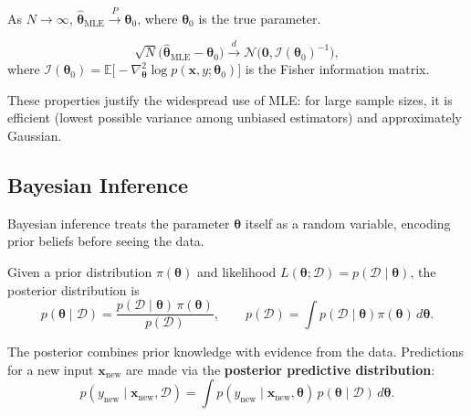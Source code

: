 \documentclass{tufte-handout}
\begin{document}
\begin{thm}[Consistency]
    As $N \to \infty$, $\hat{\boldsymbol{\theta}}_{\text{MLE}} \xrightarrow{P} \boldsymbol{\theta}_0$, where $\boldsymbol{\theta}_0$ is the true parameter.
\end{thm}

\begin{thm}
    \[
    \sqrt{N}\bigl(\hat{\boldsymbol{\theta}}_{\text{MLE}} - \boldsymbol{\theta}_0\bigr) \xrightarrow{d} \mathcal{N}\bigl(\mathbf{0}, \mathcal{I}(\boldsymbol{\theta}_0)^{-1}\bigr),
    \]
    where $\mathcal{I}(\boldsymbol{\theta}_0) = \mathbb{E}\bigl[-\nabla^2_{\boldsymbol{\theta}}\log p(\mathbf{x},y;\boldsymbol{\theta}_0)\bigr]$ is the Fisher information matrix.
\end{thm}

These properties justify the widespread use of MLE: for large sample sizes, it is efficient (lowest possible variance among unbiased estimators) and approximately Gaussian.

\subsection{Bayesian Inference}

Bayesian inference treats the parameter $\boldsymbol{\theta}$ itself as a random variable, encoding prior beliefs before seeing the data.

\begin{defn}
    Given a prior distribution $\pi(\boldsymbol{\theta})$ and likelihood $L(\boldsymbol{\theta}; \mathcal{D}) = p(\mathcal{D} \mid \boldsymbol{\theta})$, the posterior distribution is
    \[
    p(\boldsymbol{\theta} \mid \mathcal{D}) = \frac{p(\mathcal{D} \mid \boldsymbol{\theta}) \, \pi(\boldsymbol{\theta})}{p(\mathcal{D})},
    \qquad p(\mathcal{D}) = \int p(\mathcal{D} \mid \boldsymbol{\theta}) \pi(\boldsymbol{\theta})\,d\boldsymbol{\theta}.
    \]
\end{defn}

The posterior combines prior knowledge with evidence from the data. Predictions for a new input $\mathbf{x}_{\text{new}}$ are made via the \textbf{posterior predictive distribution}:
\[
p(y_{\text{new}} \mid \mathbf{x}_{\text{new}}, \mathcal{D}) = \int p(y_{\text{new}} \mid \mathbf{x}_{\text{new}}, \boldsymbol{\theta}) \, p(\boldsymbol{\theta} \mid \mathcal{D}) \, d\boldsymbol{\theta}.
\]
\end{document}
